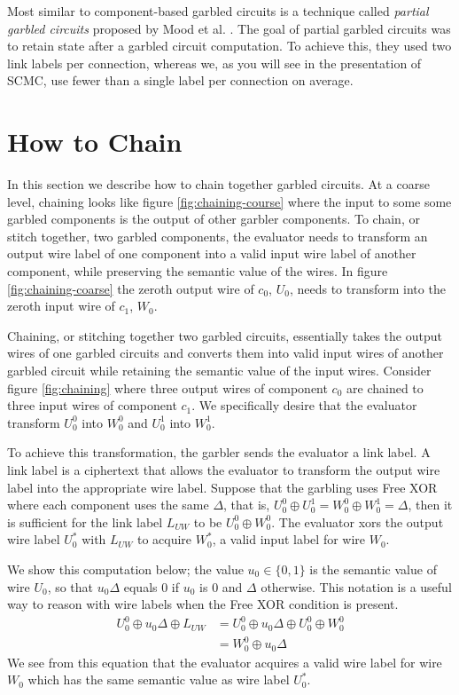 Most similar to component-based garbled circuits is a technique called \textit{partial garbled circuits} proposed by Mood et al. \cite{MGBF14}. 
The goal of partial garbled circuits was to retain state after a garbled circuit computation. 
To achieve this, they used two link labels per connection, whereas we, as you will see in the presentation of SCMC, use fewer than a single label per connection on average.   

\section{How to Chain}
In this section we describe how to chain together garbled circuits.
At a coarse level, chaining looks like figure \ref{fig:chaining-course} where the input to some some garbled components is the output of other garbler components. 
To chain, or stitch together, two garbled components, the evaluator needs to transform an output wire label of one component into a valid input wire label of another component, while preserving the semantic value of the wires. 
In figure \ref{fig:chaining-coarse} the zeroth output wire of $c_0$, $U_0$, needs to transform into the zeroth input wire of $c_1$, $W_0$. 

Chaining, or stitching together two garbled circuits, essentially takes the output wires of one garbled circuits and converts them into valid input wires of another garbled circuit while retaining the semantic value of the input wires.
Consider figure \ref{fig:chaining} where three output wires of component $c_0$ are chained to three input wires of component $c_1$. 
We specifically desire that the evaluator transform $U_0^0$ into $W_0^0$ and $U_0^1$ into $W_0^1$. 

To achieve this transformation, the garbler sends the evaluator a link label.
A link label is a ciphertext that allows the evaluator to transform the output wire label into the appropriate wire label. 
Suppose that the garbling uses Free XOR where each component uses the same $\Delta$, that is, $U_0^0 \oplus U_0^1 = W_0^0 \oplus W_0^1 = \Delta$, then it is sufficient for the link label $L_{UW}$ to be $U_0^0 \oplus W_0^0$.
The evaluator xors the output wire label $U_0^*$ with $L_{UW}$ to acquire $W_0^*$, a valid input label for wire $W_0$. 

We show this computation below; the value $u_0 \in \{0,1\}$ is the semantic value of wire $U_0$, so that $u_0\Delta$ equals $0$ if $u_0$ is $0$ and $\Delta$ otherwise. 
This notation is a useful way to reason with wire labels when the Free XOR condition is present. 
\begin{align}
	U_0^0 \oplus u_0 \Delta \oplus L_{UW} & = U_0^0 \oplus u_0 \Delta \oplus U_0^0 \oplus W_0^0 \\
	& = W_0^0 \oplus u_0 \Delta
\end{align}
We see from this equation that the evaluator acquires a valid wire label for wire $W_0$ which has the same semantic value as wire label $U_0^*$.

